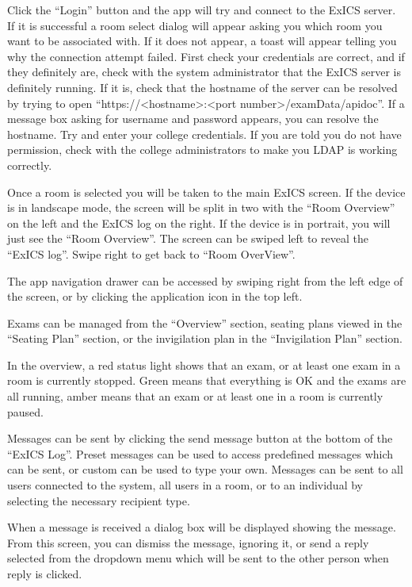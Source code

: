 Click the ``Login'' button and the app will try and connect to the ExICS server.  If it is successful a room select dialog will appear asking you which room you want to be associated with.  If it does not appear, a toast will appear telling you why the connection attempt failed.  First check your credentials are correct, and if they definitely are, check with the system administrator that the ExICS server is definitely running.  If it is, check that the hostname of the server can be resolved by trying to open ``https://\textless hostname\textgreater :\textless port number\textgreater/examData/apidoc''.  If a message box asking for username and password appears, you can resolve the hostname.  Try and enter your college credentials.  If you are told you do not have permission, check with the college administrators to make you LDAP is working correctly.

Once a room is selected you will be taken to the main ExICS screen.  If the device is in landscape mode, the screen will be split in two with the ``Room Overview'' on the left and the ExICS log on the right.  If the device is in portrait, you will just see the ``Room Overview''.  The screen can be swiped left to reveal the ``ExICS log''.  Swipe right to get back to ``Room OverView''.

The app navigation drawer can be accessed by swiping right from the left edge of the screen, or by clicking the application icon in the top left.

Exams can be managed from the ``Overview'' section, seating plans viewed in the ``Seating Plan'' section, or the invigilation plan in the ``Invigilation Plan'' section.

In the overview, a red status light shows that an exam, or at least one exam in a room is currently stopped.  Green means that everything is OK and the exams are all running, amber means that an exam or at least one in a room is currently paused.

Messages can be sent by clicking the send message button at the bottom of the ``ExICS Log''.  Preset messages can be used to access predefined messages which can be sent, or custom can be used to type your own.  Messages can be sent to all users connected to the system, all users in a room, or to an individual by selecting the necessary recipient type.

When a message is received a dialog box will be displayed showing the message.  From this screen, you can dismiss the message, ignoring it, or send a reply selected from the dropdown menu which will be sent to the other person when reply is clicked.